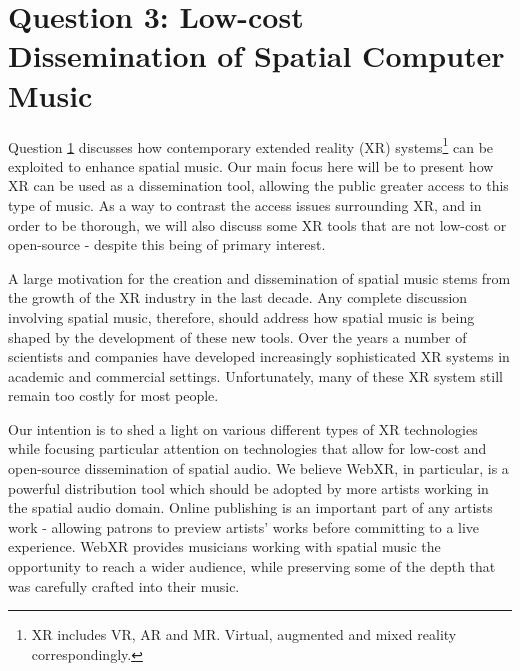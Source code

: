 \chapter{Question 3: Low-cost Dissemination of Spatial Computer Music}
\label{ch:xr-mus}



Question \ref{ch:xr-mus} discusses how contemporary extended reality (XR) systems\footnote{XR includes VR, AR and MR. Virtual, augmented and mixed reality correspondingly.} can be exploited to enhance spatial music. Our main focus here will be to present how XR can be used as a dissemination tool, allowing the public greater access to this type of music. As a way to contrast the access issues surrounding XR, and in order to be thorough, we will also discuss some XR tools that are not low-cost or open-source - despite this being of primary interest.


A large motivation for the creation and dissemination of spatial music stems from the growth of the XR industry in the last decade. Any complete discussion involving spatial music, therefore, should address how spatial music is being shaped by the development of these new tools. Over the years a number of scientists and companies have developed increasingly sophisticated XR systems in academic and commercial settings. Unfortunately, many of these XR system still remain too costly for most people. 

Our intention is to shed a light on various different types of XR technologies while focusing particular attention on technologies that allow for low-cost and open-source dissemination of spatial audio. We believe WebXR, in particular, is a powerful distribution tool which should be adopted by more artists working in the spatial audio domain. Online publishing is an important part of any artists work - allowing patrons to preview artists' works before committing to a live experience. WebXR provides musicians working with spatial music the opportunity to reach a wider audience, while preserving some of the depth that was carefully crafted into their music.


